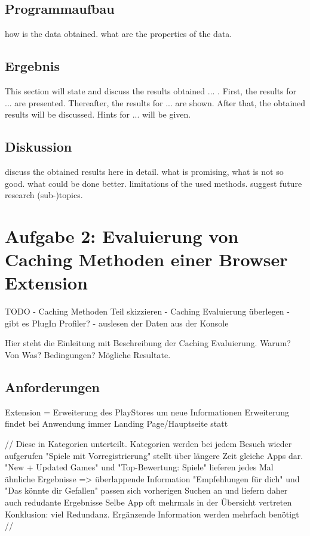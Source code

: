 \subsection{Programmaufbau}
\label{ss:datasource}

how is the data obtained. what are the properties of the data.


\subsection{Ergebnis}
\label{ss:results}

This section will state and discuss the results obtained ... . First, the results for ... are presented. Thereafter, the results for ... are shown. After that, the obtained results will be discussed. Hints for ... will be given.




\subsection{Diskussion}
\label{ss:discussion_details}

discuss the obtained results here in detail. what is promising, what is not so good. what could be done better. limitations of the used methods. suggest future research (sub-)topics.







\section{Aufgabe 2: Evaluierung von Caching Methoden einer Browser Extension}
\label{s:solution_prob_2}

TODO
- Caching Methoden Teil skizzieren
- Caching Evaluierung überlegen
- gibt es PlugIn Profiler?
- auslesen der Daten aus der Konsole

Hier steht die Einleitung mit Beschreibung der Caching Evaluierung. Warum? Von Was? Bedingungen? Mögliche Resultate.


\subsection{Anforderungen}
Extension = Erweiterung des PlayStores um neue Informationen
Erweiterung findet bei Anwendung immer Landing Page/Hauptseite statt

//
Diese in Kategorien unterteilt. Kategorien werden bei jedem Besuch wieder aufgerufen
"Spiele mit Vorregistrierung" stellt über längere Zeit gleiche Apps dar.
"New + Updated Games" und "Top-Bewertung: Spiele" lieferen jedes Mal ähnliche Ergebnisse => überlappende Information
"Empfehlungen für dich" und "Das könnte dir Gefallen" passen sich vorherigen Suchen an und liefern daher auch redudante Ergebnisse
Selbe App oft mehrmals in der Übersicht vertreten
Konklusion: viel Redundanz. Ergänzende Information werden mehrfach benötigt
//

